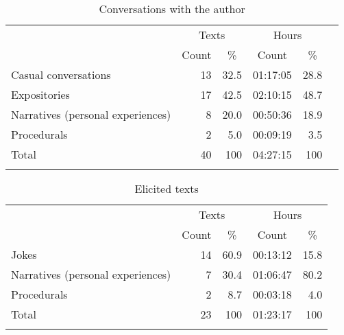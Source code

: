 {\begin{table}[p]
\end{table}


\begin{table}[p]
\caption{Conversations with the author}\label{Table_1.16}

\begin{tabular}{lrrrrr}
\lsptoprule
 \multicolumn{1}{c}{Contents} & \multicolumn{2}{c}{Texts} & \multicolumn{2}{c}{Hours}\\\cmidrule(lr){2-3}\cmidrule(lr){4-5}
 & \multicolumn{1}{c}{Count} & \multicolumn{1}{c}{\%} & \multicolumn{1}{c}{Count} & \multicolumn{1}{c}{\%} \\
\midrule
Casual conversations &  13 &  32.5 &  01:17:05 &  28.8\\
Expositories &  17 &  42.5 &  02:10:15 &  48.7\\
Narratives (personal experiences) &  8 &  20.0 &  00:50:36 &  18.9\\
Procedurals &  2 &  5.0 &  00:09:19 &  3.5\\
\midrule
Total &  40 &  100 &  04:27:15 &  100\\
\lspbottomrule
\end{tabular}
\end{table}



\begin{table}
\caption{Elicited texts}\label{Table_1.17}


\begin{tabular}{lrrcr}
\lsptoprule
\multicolumn{1}{c}{Contents} & \multicolumn{2}{c}{Texts} & \multicolumn{2}{c}{Hours}\\\cmidrule(lr){2-3}\cmidrule(lr){4-5}
& \multicolumn{1}{c}{Count} & \multicolumn{1}{c}{\%} & \multicolumn{1}{c}{Count} & \multicolumn{1}{c}{\%} \\
\midrule
Jokes &  14 &  60.9 &  00:13:12 &  15.8\\
Narratives (personal experiences) &  7 &  30.4 &  01:06:47 &  80.2\\
Procedurals &  2 &  8.7 &  00:03:18 &  4.0\\
\midrule
Total &  23 &  100 &  01:23:17 &  100\\
\lspbottomrule
\end{tabular}
\end{table}

}
